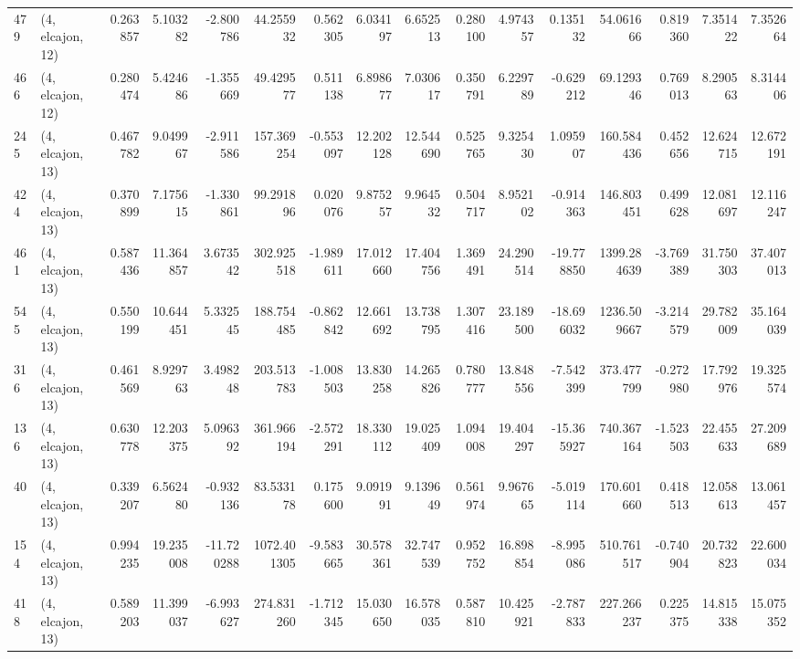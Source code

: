 \begin{tabular}{llrrrrrrrrrrrrrr}
479 &  (4, elcajon, 12) &   0.263857 &   5.103282 &  -2.800786 &    44.255932 &   0.562305 &   6.034197 &   6.652513 &  0.280100 &   4.974357 &   0.135132 &    54.061666 &  0.819360 &   7.351422 &   7.352664 \\
466 &  (4, elcajon, 12) &   0.280474 &   5.424686 &  -1.355669 &    49.429577 &   0.511138 &   6.898677 &   7.030617 &  0.350791 &   6.229789 &  -0.629212 &    69.129346 &  0.769013 &   8.290563 &   8.314406 \\
245 &  (4, elcajon, 13) &   0.467782 &   9.049967 &  -2.911586 &   157.369254 &  -0.553097 &  12.202128 &  12.544690 &  0.525765 &   9.325430 &   1.095907 &   160.584436 &  0.452656 &  12.624715 &  12.672191 \\
424 &  (4, elcajon, 13) &   0.370899 &   7.175615 &  -1.330861 &    99.291896 &   0.020076 &   9.875257 &   9.964532 &  0.504717 &   8.952102 &  -0.914363 &   146.803451 &  0.499628 &  12.081697 &  12.116247 \\
461 &  (4, elcajon, 13) &   0.587436 &  11.364857 &   3.673542 &   302.925518 &  -1.989611 &  17.012660 &  17.404756 &  1.369491 &  24.290514 & -19.778850 &  1399.284639 & -3.769389 &  31.750303 &  37.407013 \\
545 &  (4, elcajon, 13) &   0.550199 &  10.644451 &   5.332545 &   188.754485 &  -0.862842 &  12.661692 &  13.738795 &  1.307416 &  23.189500 & -18.696032 &  1236.509667 & -3.214579 &  29.782009 &  35.164039 \\
316 &  (4, elcajon, 13) &   0.461569 &   8.929763 &   3.498248 &   203.513783 &  -1.008503 &  13.830258 &  14.265826 &  0.780777 &  13.848556 &  -7.542399 &   373.477799 & -0.272980 &  17.792976 &  19.325574 \\
136 &  (4, elcajon, 13) &   0.630778 &  12.203375 &   5.096392 &   361.966194 &  -2.572291 &  18.330112 &  19.025409 &  1.094008 &  19.404297 & -15.365927 &   740.367164 & -1.523503 &  22.455633 &  27.209689 \\
40  &  (4, elcajon, 13) &   0.339207 &   6.562480 &  -0.932136 &    83.533178 &   0.175600 &   9.091991 &   9.139649 &  0.561974 &   9.967665 &  -5.019114 &   170.601660 &  0.418513 &  12.058613 &  13.061457 \\
154 &  (4, elcajon, 13) &   0.994235 &  19.235008 & -11.720288 &  1072.401305 &  -9.583665 &  30.578361 &  32.747539 &  0.952752 &  16.898854 &  -8.995086 &   510.761517 & -0.740904 &  20.732823 &  22.600034 \\
418 &  (4, elcajon, 13) &   0.589203 &  11.399037 &  -6.993627 &   274.831260 &  -1.712345 &  15.030650 &  16.578035 &  0.587810 &  10.425921 &  -2.787833 &   227.266237 &  0.225375 &  14.815338 &  15.075352 \\

\end{tabular}
